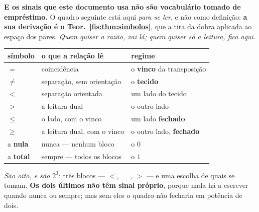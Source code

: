 \documentclass[livro.tex]{subfiles}
\begin{document}
\medskip\noindent\textbf{E os sinais que este documento usa não são vocabulário
tomado de empréstimo.} O quadro seguinte está aqui \emph{para se ler}, e não como
definição: \textbf{a sua derivação é o Teor.~\ref{fis:thm:simbolos}}, que a tira
da dobra aplicada ao espaço dos pares. \emph{Quem quiser a razão, vai lá; quem
quiser só a leitura, fica aqui.}
\begin{center}\small
\begin{tabular}{@{}lll@{}}
\toprule
símbolo & o que a relação lê & regime \\
\midrule
$=$ & coincidência & o \textbf{vinco} da transposição \\
$\neq$ & separação, sem orientação & o \textbf{tecido} \\
$<$ & separação orientada & um lado do tecido \\
$>$ & a leitura dual & o outro lado \\
$\le$ & o lado, com o vinco & um lado \textbf{fechado} \\
$\ge$ & a leitura dual, com o vinco & o outro lado, \textbf{fechado} \\
\midrule
a \textbf{nula} & nunca --- nenhum bloco & o $0$ \\
a \textbf{total} & sempre --- todos os blocos & o $1$ \\
\bottomrule
\end{tabular}
\end{center}
\noindent \emph{São oito, e são $2^{3}$}: três blocos --- $<$, $=$, $>$ --- e uma
escolha de quais se tomam. \textbf{Os dois últimos não têm sinal próprio}, porque
nada há a escrever quando nunca ou sempre; mas sem eles o quadro não fecharia em
potência de dois.
\end{document}
